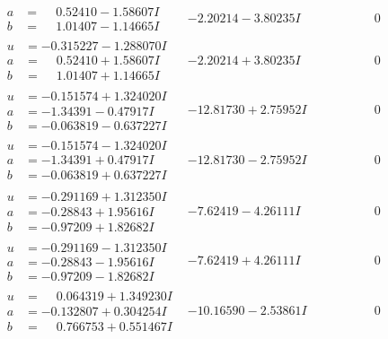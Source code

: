 \documentclass[1p]{elsarticle_modified}
\theoremstyle{definition}
\begin{document}
$$\begin{array}{c|c|c}
\begin{aligned}
a &= \phantom{-}0.52410 - 1.58607 I \\
b &= \phantom{-}1.01407 - 1.14665 I\end{aligned}
 & -2.20214 - 3.80235 I & \phantom{-0.000000 } 0 \\ \hline\begin{aligned}
u &= -0.315227 - 1.288070 I \\
a &= \phantom{-}0.52410 + 1.58607 I \\
b &= \phantom{-}1.01407 + 1.14665 I\end{aligned}
 & -2.20214 + 3.80235 I & \phantom{-0.000000 } 0 \\ \hline\begin{aligned}
u &= -0.151574 + 1.324020 I \\
a &= -1.34391 - 0.47917 I \\
b &= -0.063819 - 0.637227 I\end{aligned}
 & -12.81730 + 2.75952 I & \phantom{-0.000000 } 0 \\ \hline\begin{aligned}
u &= -0.151574 - 1.324020 I \\
a &= -1.34391 + 0.47917 I \\
b &= -0.063819 + 0.637227 I\end{aligned}
 & -12.81730 - 2.75952 I & \phantom{-0.000000 } 0 \\ \hline\begin{aligned}
u &= -0.291169 + 1.312350 I \\
a &= -0.28843 + 1.95616 I \\
b &= -0.97209 + 1.82682 I\end{aligned}
 & -7.62419 - 4.26111 I & \phantom{-0.000000 } 0 \\ \hline\begin{aligned}
u &= -0.291169 - 1.312350 I \\
a &= -0.28843 - 1.95616 I \\
b &= -0.97209 - 1.82682 I\end{aligned}
 & -7.62419 + 4.26111 I & \phantom{-0.000000 } 0 \\ \hline\begin{aligned}
u &= \phantom{-}0.064319 + 1.349230 I \\
a &= -0.132807 + 0.304254 I \\
b &= \phantom{-}0.766753 + 0.551467 I\end{aligned}
 & -10.16590 - 2.53861 I & \phantom{-0.000000 } 0 \\ \hline\begin{aligned}

\end{aligned}
\end{array}$$
\end{document}
